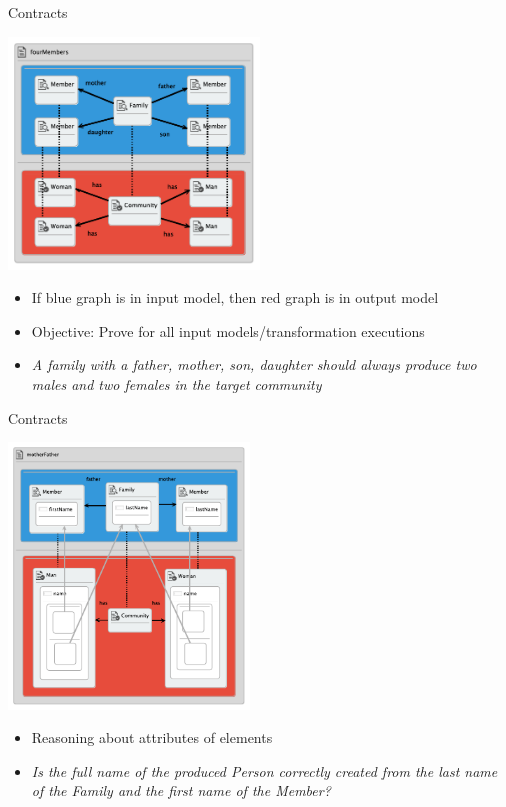 \documentclass[xcolor=dvipsnames, 12pt]{beamer}
\begin{document}
\begin{frame}{Contracts}
\begin{center}
\includegraphics[width=0.50\textwidth]{figures/fourMembersProp}
\end{center}
\pause
\begin{itemize}[<+->]
\item If blue graph is in input model, then red graph is in output model
\item Objective: Prove for all input models/transformation executions
\item \textit{A family with a father, mother, son, daughter
should always produce two males and two females in the
target community}
\end{itemize}
\end{frame}


\begin{frame}{Contracts}
\begin{center}
\includegraphics[width=0.48\textwidth]{figures/motherFatherProp}
\end{center}
\pause
\begin{itemize}[<+->]
\item Reasoning about attributes of elements
\item \textit{Is the full name of the produced Person correctly created from the last name of the Family and the first name of the Member?}
\end{itemize}
\end{frame}
\end{document}

